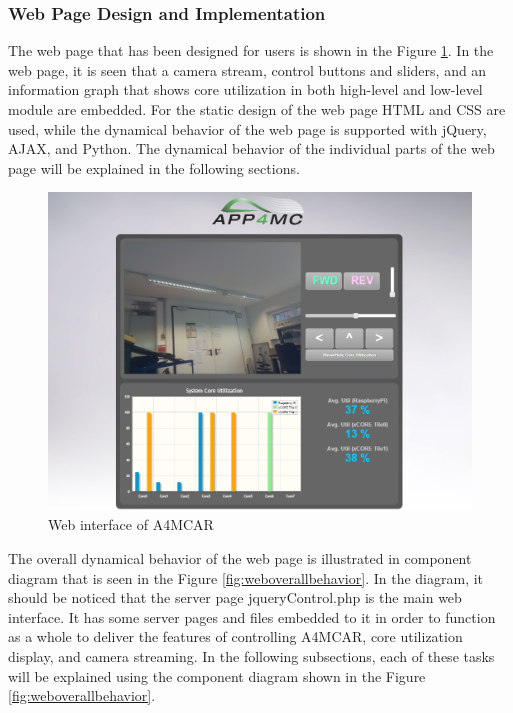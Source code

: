 \subsubsection{Web Page Design and Implementation} 
The web page that has been designed for users is shown in the Figure \ref{fig:web}. In the web page, it is seen that a camera stream, control buttons and sliders, and an information graph that shows core utilization in both high-level and low-level module are embedded. For the static design of the web page HTML and CSS are used, while the dynamical behavior of the web page is supported with jQuery, AJAX, and Python. The dynamical behavior of the individual parts of the web page will be explained in the following sections.
\begin{figure}[!ht]
	\includegraphics[scale=0.42]{content/images/web.png}
	\caption{Web interface of A4MCAR}
	\label{fig:web}
\end{figure}

The overall dynamical behavior of the web page is illustrated in component diagram that is seen in the Figure \ref{fig:weboverallbehavior}. In the diagram, it should be noticed that the server page jqueryControl.php is the main web interface. It has some server pages and files embedded to it in order to function as a whole to deliver the features of controlling A4MCAR, core utilization display, and camera streaming. In the following subsections, each of these tasks will be explained using the component diagram shown in the Figure \ref{fig:weboverallbehavior}.

